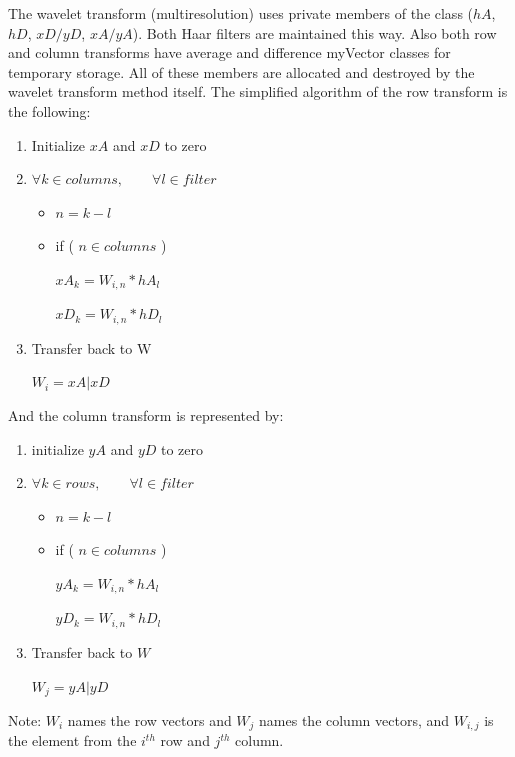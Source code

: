 The wavelet transform (multiresolution) uses private members of the class ($hA$, $hD$, $xD/yD$, $xA/yA$).  Both Haar filters are maintained this way.  Also both row and column transforms have average and difference myVector classes for temporary storage.   All of these members are allocated and destroyed by the wavelet transform method itself.   The simplified algorithm of the row transform is the following:
\begin{enumerate}
\item Initialize $xA$ and $xD$ to zero
\item $\forall k \in columns, \qquad \forall l \in filter$
\begin{itemize}
\item $n = k - l$
\item if ( $n \in columns $ )

	$xA_k = W_{i,n} * hA_l $
	
	$xD_k = W_{i,n} * hD_l $
	
	
\end{itemize}
\item Transfer back to W

	$W_i = xA|xD $
\end{enumerate}

And the column transform is represented by:
\begin{enumerate}
\item initialize $yA$ and $yD$ to zero
\item $\forall k \in rows, \qquad  \forall l \in filter$
\begin{itemize}
\item $n = k - l$
\item if ( $n \in columns $ )

	$yA_k = W_{i,n} * hA_l $
	
	$yD_k = W_{i,n} * hD_l $
	
	
\end{itemize}
\item Transfer back to $W$

	$W_j = yA|yD $
\end{enumerate}

Note: $W_i$ names the row vectors and $W_j$ names the column vectors, and $W_{i,j}$ is the element from the $i^{th}$ row and $j^{th}$ column.



